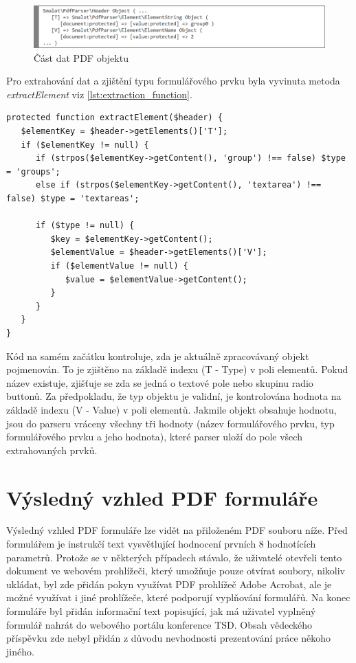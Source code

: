 \begin{figure}[h!]
\centering
\includegraphics[width=15cm]{img/parsing_object}
\caption{Část dat PDF objektu}
\label{fig:parsing_object}
\end{figure}
\par
Pro extrahování dat a zjištění typu formulářového prvku byla vyvinuta metoda \textit{extractElement} viz \ref{lst:extraction_function}.
\begin{lstlisting}[caption = {Funkční kód pro uložení formulářových prvků z PDF objektů}, label = {lst:extraction_function}, captionpos=b]
protected function extractElement($header) {
   $elementKey = $header->getElements()['T'];                                                      
   if ($elementKey != null) {
      if (strpos($elementKey->getContent(), 'group') !== false) $type = 'groups';
      else if (strpos($elementKey->getContent(), 'textarea') !== false) $type = 'textareas';
                       
      if ($type != null) {
         $key = $elementKey->getContent();
         $elementValue = $header->getElements()['V'];
         if ($elementValue != null) {
            $value = $elementValue->getContent();
         }    
      }
   }
}
\end{lstlisting}
Kód na samém začátku kontroluje, zda je aktuálně zpracovávaný objekt pojmenován. To je zjištěno na základě indexu  (T - Type) v poli elementů. Pokud název existuje, zjišťuje se zda se jedná o textové pole nebo skupinu radio buttonů. Za předpokladu, že typ objektu je validní, je kontrolována hodnota na základě indexu  (V - Value) v poli elementů. Jakmile objekt obsahuje hodnotu, jsou do parseru vráceny všechny tři hodnoty (název formulářového prvku, typ formulářového prvku a jeho hodnota), které parser uloží do pole všech extrahovaných prvků.

\section{Výsledný vzhled PDF formuláře}
Výsledný vzhled PDF formuláře lze vidět na přiloženém PDF souboru níže. Před formulářem je instrukčí text vysvětlující hodnocení prvních 8 hodnotících parametrů. Protože se v některých případech stávalo, že uživatelé otevřeli tento dokument ve webovém prohlížeči, který umožňuje pouze otvírat soubory, nikoliv ukládat, byl zde přidán pokyn využívat PDF prohlížeč Adobe Acrobat, ale je možné využívat i jiné prohlížeče, které podporují vyplňování formulářů. Na konec formuláře byl přidán informační text popisující, jak má uživatel vyplněný formulář nahrát do webového portálu konference TSD. Obsah vědeckého příspěvku zde nebyl přidán z důvodu nevhodnosti prezentování práce někoho jiného.
\newpage

\newpage


